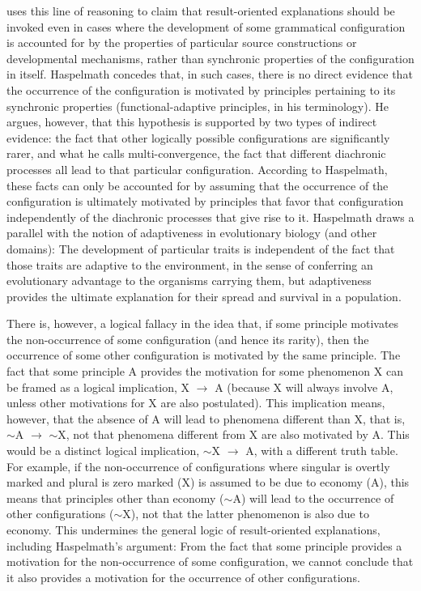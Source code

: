 \documentclass[output=paper]{langsci/langscibook}
\begin{document}
 uses this line of reasoning to claim that
result-oriented explanations  should be invoked even in cases where
the development of some grammatical configuration is accounted
for by the properties of particular source constructions or developmental
mechanisms, rather than synchronic properties of the configuration in itself.  Haspelmath concedes that, in such cases,
there is no direct evidence that the occurrence of the
configuration is motivated by principles pertaining to its synchronic
properties (functional-adaptive principles, in his terminology). He argues, however, that this
hypothesis is supported by two types of indirect evidence: the fact
that other logically possible configurations are significantly rarer, and what he calls
multi-convergence, the fact that different  diachronic processes all
lead to that particular configuration. According to Haspelmath, these facts
can only be accounted for by assuming that the occurrence of
the configuration is ultimately motivated by
principles that favor that configuration independently of the
diachronic processes that give rise to it.
 Haspelmath draws a parallel with the notion
of adaptiveness in evolutionary biology (and other domains):
The development of particular traits is independent of the fact that
those traits are adaptive to the environment, in the sense of conferring an evolutionary advantage to the organisms
carrying them, but adaptiveness provides the ultimate explanation for their
spread and survival in a population.

There is, however, a logical fallacy in the idea that, if some
 principle motivates the  non-occurrence of some
configuration (and hence its rarity),
then the occurrence of some other configuration is motivated by the
same principle. The fact that some principle A provides the motivation
for some phenomenon X can be framed as a logical implication,  X
$\rightarrow$ A (because X will always involve A, unless other
motivations for X are also postulated).  This
implication means, however, that the absence of A will lead to phenomena different
than X, that is, $\sim$A $\rightarrow$ $\sim$X, not that phenomena
different from X are also motivated by A. This would be a distinct logical
implication, $\sim$X $\rightarrow$ A, with a different truth table.
For example, if the non-occurrence
of configurations where singular is
overtly marked and plural is zero marked (X)  is assumed to be due to
economy (A), this means that principles other than economy ($\sim$A) will lead to the occurrence of other configurations ($\sim$X), not that
the latter phenomenon is also due to economy. This undermines the general
logic of result-oriented explanations, including Haspelmath's
argument: From the fact that some principle provides 
a motivation for the non-occurrence of some
configuration, we cannot conclude that it also provides a
motivation for the occurrence of other configurations.
\end{document}
